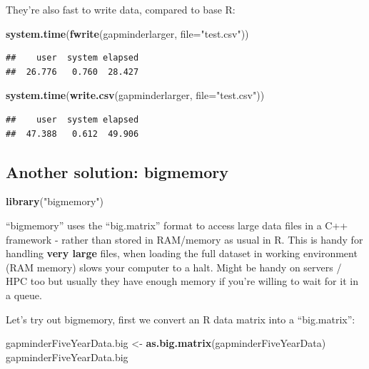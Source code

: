 \documentclass[]{article}
\newenvironment{Shaded}{\begin{snugshade}}{\end{snugshade}}
\newcommand{\KeywordTok}[1]{\textcolor[rgb]{0.13,0.29,0.53}{\textbf{{#1}}}}
\newcommand{\DataTypeTok}[1]{\textcolor[rgb]{0.13,0.29,0.53}{{#1}}}
\newcommand{\StringTok}[1]{\textcolor[rgb]{0.31,0.60,0.02}{{#1}}}
\newcommand{\NormalTok}[1]{{#1}}
\begin{document}
They're also fast to write data, compared to base R:

\begin{Shaded}
\begin{Highlighting}[]
\KeywordTok{system.time}\NormalTok{(}\KeywordTok{fwrite}\NormalTok{(gapminderlarger, }\DataTypeTok{file=}\StringTok{"test.csv"}\NormalTok{))}
\end{Highlighting}
\end{Shaded}

\begin{verbatim}
##    user  system elapsed 
##  26.776   0.760  28.427
\end{verbatim}

\begin{Shaded}
\begin{Highlighting}[]
\KeywordTok{system.time}\NormalTok{(}\KeywordTok{write.csv}\NormalTok{(gapminderlarger, }\DataTypeTok{file=}\StringTok{"test.csv"}\NormalTok{))}
\end{Highlighting}
\end{Shaded}

\begin{verbatim}
##    user  system elapsed 
##  47.388   0.612  49.906
\end{verbatim}

\subsection{Another solution:
bigmemory}\label{another-solution-bigmemory}

\begin{Shaded}
\begin{Highlighting}[]
\KeywordTok{library}\NormalTok{(}\StringTok{"bigmemory"}\NormalTok{)}
\end{Highlighting}
\end{Shaded}

``bigmemory'' uses the ``big.matrix'' format to access large data files
in a C++ framework - rather than stored in RAM/memory as usual in R.
This is handy for handling \textbf{very large} files, when loading the
full dataset in working environment (RAM memory) slows your computer to
a halt. Might be handy on servers / HPC too but usually they have enough
memory if you're willing to wait for it in a queue.

Let's try out bigmemory, first we convert an R data matrix into a
``big.matrix'':

\begin{Shaded}
\begin{Highlighting}[]
\NormalTok{gapminderFiveYearData.big <-}\StringTok{ }\KeywordTok{as.big.matrix}\NormalTok{(gapminderFiveYearData)}
\NormalTok{gapminderFiveYearData.big}
\end{Highlighting}
\end{Shaded}
\end{document}
